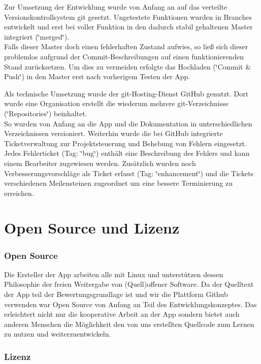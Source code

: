 \documentclass[a4paper,ngerman,12pt]{scrreprt}
\newcommand{\+}{\discretionary{\mbox{\scriptsize$\hookleftarrow$}}{}{}}
\begin{document}
Zur Umsetzung der Entwicklung wurde von Anfang an auf das verteilte Versionskontrollsystem git gesetzt. Ungetestete Funktionen wurden in Branches entwickelt und erst bei voller Funktion in den dadurch stabil gehaltenen Master integriert (\char`\"{}merged\char`\"{}). \\
Falls dieser Master doch einen fehlerhaften Zustand aufwies, so ließ sich dieser problemlos aufgrund der Commit-\/\+Beschreibungen auf einen funktionierenden Stand zurücksetzen. Um dies zu vermeiden erfolgte das Hochladen (\char`\"{}\+Commit \& Push\char`\"{}) in den Master erst nach vorherigem Testen der App. 

Als technische Umsetzung wurde der git-\/\+Hosting-\/\+Dienst Git\+Hub genutzt. Dort wurde eine Organisation erstellt die wiederum mehrere git-\/\+Verzeichnisse (\char`\"{}\+Repositories\char`\"{}) beinhaltet. \\
So wurden von Anfang an die App und die Dokumentation in unterschiedlichen Verzeichnissen versioniert. Weiterhin wurde die bei Git\+Hub integrierte Ticketverwaltung zur Projektsteuerung und Behebung von Fehlern eingesetzt.\\
Jedes Fehlerticket (Tag\+: \char`\"{}bug\char`\"{}) enthält eine Beschreibung des Fehlers und kann einem Bearbeiter zugewiesen werden. Zusätzlich wurden noch Verbesserungsvorschläge als Ticket erfasst (Tag\+: \char`\"{}enhancement\char`\"{}) und die Tickets verschiedenen Meilensteinen zugeordnet um eine bessere Terminierung zu erreichen. 

\chapter{Open Source und Lizenz}
\subsection*{Open Source}
Die Ersteller der App arbeiten alle mit Linux und unterstützen dessen Philosophie der freien Weitergabe von (Quell)offener Software. Da der Quelltext der App teil der Bewertungsgrundlage ist und wir die Plattform Github verwenden war Open Source von Anfang an Teil des Entwicklungskonzeptes. Das erleichtert nicht nur die kooperative Arbeit an der App sondern bietet auch anderen Menschen die Möglichkeit den von uns erstellten Quellcode zum Lernen zu nutzen und weiterzuentwickeln.

\subsection*{Lizenz}
\end{document}
